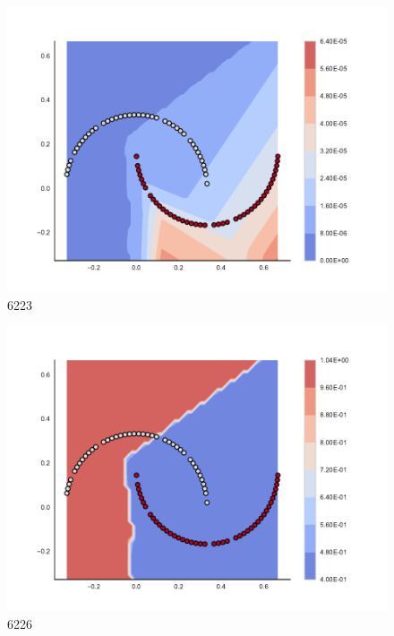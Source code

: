 \begin{subfigure}[b]{0.09\textwidth}
    \includegraphics[width=\textwidth]{img/convergence/6223.pdf}
    \caption{6223}
    \label{fig:convergence_6223}
\end{subfigure}
%
\begin{subfigure}[b]{0.09\textwidth}
    \includegraphics[width=\textwidth]{img/convergence/6226.pdf}
    \caption{6226}
    \label{fig:convergence_6226}
\end{subfigure}
%
